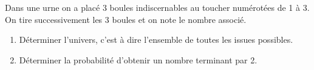 
Dans une urne on a placé 3 boules indiscernables au toucher numérotées de 1 à 3. On tire
successivement les 3 boules et on note le nombre associé.
\begin{enumerate}
\item Déterminer l'univers, c'est à dire l'ensemble de toutes les issues possibles.
\item Déterminer la probabilité d'obtenir un nombre terminant par 2.
\end{enumerate}
